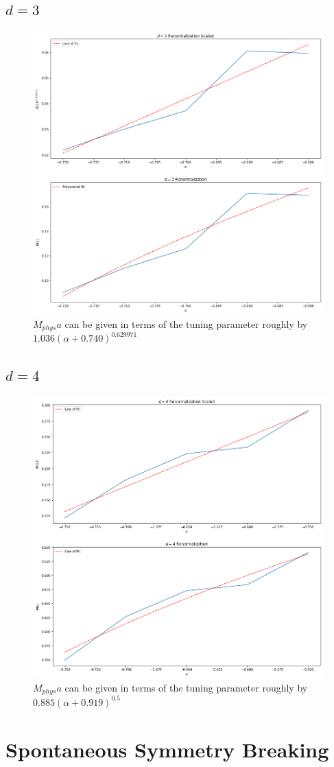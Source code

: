 \documentclass[12]{report}
\newcommand\0{\mathbf{0}}
\newcommand\<{\langle}
\renewcommand\>{\rangle}
\begin{document}
\subsection{$d=3$}

\begin{figure}[H]
\centering
\includegraphics[width=\textwidth]{renormalization_3}
\caption{$M_{phys}a$ can be given in terms of the tuning parameter roughly by $1.036(\alpha + 0.740)^{0.629971}$}		
\end{figure}

\subsection{$d=4$}

\begin{figure}[H]
\centering
\includegraphics[width=\textwidth]{renormalization_4}
\caption{$M_{phys}a$ can be given in terms of the tuning parameter roughly by $0.885(\alpha + 0.919)^{0.5}$}		
\end{figure}

\section{Spontaneous Symmetry Breaking}
\end{document}
